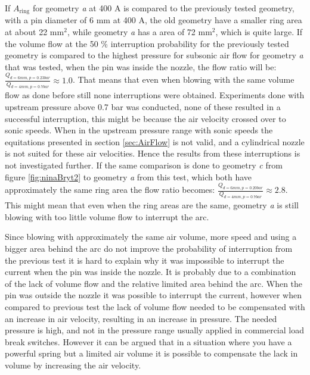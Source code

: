 \documentclass[10pt,a4paper,twoside]{article}
\begin{document}
If $A_\mathrm{{ring}}$ for geometry \textit{a} at 400 A is compared to the previously tested geometry, with a pin diameter of 6 mm at 400 A, the old geometry have a smaller ring area at about 22 $\mathrm{{mm^2}}$, while geometry \textit{a} has a area of 72 $\mathrm{{mm^2}}$, which is quite large. If the volume flow at the 50 \% interruption probability for the previously tested geometry is compared to the highest pressure for subsonic air flow for geometry \textit{a} that was tested, when the pin was inside the nozzle, the flow ratio will be: $\frac{Q_{d=6 mm, p=0.23 bar}}{Q_{d=4 mm, p=0.7 bar}}\approx 1.0$. That means that even when blowing with the same volume flow as done before still none interruptions were obtained. Experiments done with upstream pressure above 0.7 bar was conducted, none of these resulted in a successful interruption, this might be because the air velocity crossed over to sonic speeds. When in the upstream pressure range with sonic speeds the equitations presented in section \ref{sec:AirFlow} is not valid, and a cylindrical nozzle is not suited for these air velocities. Hence the results from these interruptions is not investigated further. If the same comparison is done to geometry \textit{c} from figure \ref{fig:ninaBryt2} to geometry \textit{a} from this test, which both have approximately the same ring area the flow ratio becomes: $\frac{Q_{d=6 mm, p=0.20 bar}}{Q_{d=4 mm, p=0.7 bar}}\approx 2.8$. This might mean that even when the ring areas are the same, geometry \textit{a} is still blowing with too little volume flow to interrupt the arc.

Since blowing with approximately the same air volume, more speed and using a bigger area behind the arc do not improve the probability of interruption from the previous test it is hard to explain why it was impossible to interrupt the current when the pin was inside the nozzle. It is probably due to a combination of the lack of volume flow and the relative limited area behind the arc. When the pin was outside the nozzle it was possible to interrupt the current, however when compared to previous test the lack of volume flow needed to be compensated with an increase in air velocity, resulting in an increase in pressure. The needed pressure is high, and not in the pressure range usually applied in commercial load break switches. However it can be argued that in a situation where you have a powerful spring but a limited air volume it is possible to compensate the lack in volume by increasing the air velocity.
\end{document}
